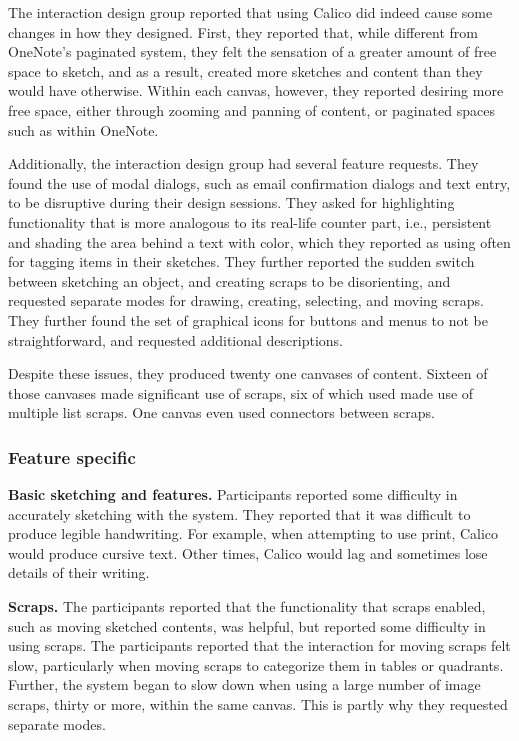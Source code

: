 \documentclass[12pt,fleqn]{ucithesis}
\begin{document}
The interaction design group reported that using Calico did indeed cause some changes in how they designed. First, they reported that, while different from OneNote's paginated system, they felt the sensation of a greater amount of free space to sketch, and as a result, created more sketches and content than they would have otherwise. Within each canvas, however, they reported desiring more free space, either through zooming and panning of content, or paginated spaces such as within OneNote. 

Additionally, the interaction design group had several feature requests. They found the use of modal dialogs, such as email confirmation dialogs and text entry, to be disruptive during their design sessions. They asked for highlighting functionality that is more analogous to its real-life counter part, i.e., persistent and shading the area behind a text with color, which they reported as using often for tagging items in their sketches. They further reported the sudden switch between sketching an object, and creating scraps to be disorienting, and requested separate modes for drawing, creating, selecting, and moving scraps. They further found the set of graphical icons for buttons and menus to not be straightforward, and requested additional descriptions.

Despite these issues, they produced twenty one canvases of content. Sixteen of those canvases made significant use of scraps, six of which used made use of multiple list scraps. One canvas even used connectors between scraps.

\subsubsection{Feature specific}

\textbf{Basic sketching and features.} Participants reported some difficulty in accurately sketching with the system. They reported that it was difficult to produce legible handwriting. For example, when attempting to use print, Calico would produce cursive text. Other times, Calico would lag and sometimes lose details of their writing.

\textbf{Scraps.} The participants reported that the functionality that scraps enabled, such as moving sketched contents, was helpful, but reported some difficulty in using scraps. The participants reported that the interaction for moving scraps felt slow, particularly when moving scraps to categorize them in tables or quadrants. Further, the system began to slow down when using a large number of image scraps, thirty or more, within the same canvas. This is partly why they requested separate modes.
\end{document}
